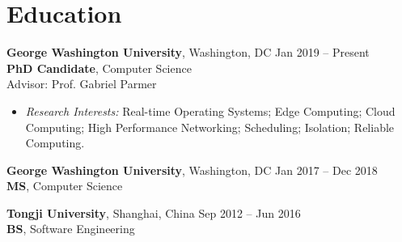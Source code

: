 \section{Education}
\textbf{George Washington University}, Washington, DC \hfill
{\small Jan 2019 -- Present}
\\
\textbf{PhD Candidate}, Computer Science \hfill
\\
{Advisor:} Prof. Gabriel Parmer
\\
\begin{itemize}[leftmargin=*]
  \setlength\itemsep{-0.0em}
\vspace{-0.8em}
\item {\sl Research Interests:} {Real-time Operating Systems; Edge Computing; Cloud Computing; High Performance Networking; Scheduling; Isolation; Reliable Computing.}
\end{itemize}
\vspace{-0.3em}

\textbf{George Washington University}, Washington, DC \hfill
{\small Jan 2017 -- Dec 2018}
\\
\textbf{MS}, Computer Science

\textbf{Tongji University}, Shanghai, China \hfill
{\small Sep 2012 -- Jun 2016}
\\
\textbf{BS}, Software Engineering
\\
